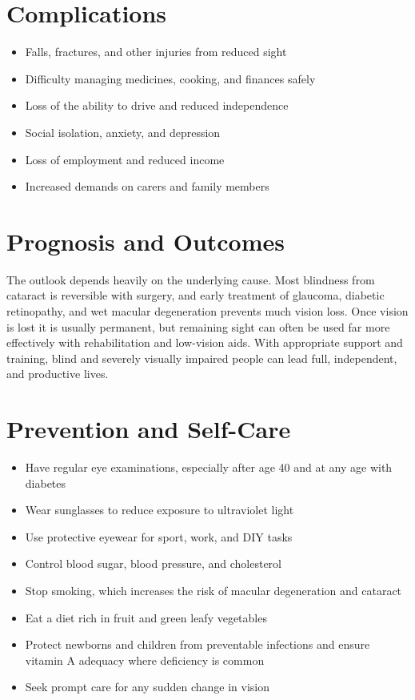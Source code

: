 \section*{Complications}
\begin{itemize}
    \item Falls, fractures, and other injuries from reduced sight
    \item Difficulty managing medicines, cooking, and finances safely
    \item Loss of the ability to drive and reduced independence
    \item Social isolation, anxiety, and depression
    \item Loss of employment and reduced income
    \item Increased demands on carers and family members
\end{itemize}

\section*{Prognosis and Outcomes}
The outlook depends heavily on the underlying cause. Most blindness from cataract is reversible with surgery, and early treatment of glaucoma, diabetic retinopathy, and wet macular degeneration prevents much vision loss. Once vision is lost it is usually permanent, but remaining sight can often be used far more effectively with rehabilitation and low-vision aids. With appropriate support and training, blind and severely visually impaired people can lead full, independent, and productive lives.

\section*{Prevention and Self-Care}
\begin{itemize}
    \item Have regular eye examinations, especially after age 40 and at any age with diabetes
    \item Wear sunglasses to reduce exposure to ultraviolet light
    \item Use protective eyewear for sport, work, and DIY tasks
    \item Control blood sugar, blood pressure, and cholesterol
    \item Stop smoking, which increases the risk of macular degeneration and cataract
    \item Eat a diet rich in fruit and green leafy vegetables
    \item Protect newborns and children from preventable infections and ensure vitamin A adequacy where deficiency is common
    \item Seek prompt care for any sudden change in vision
\end{itemize}

